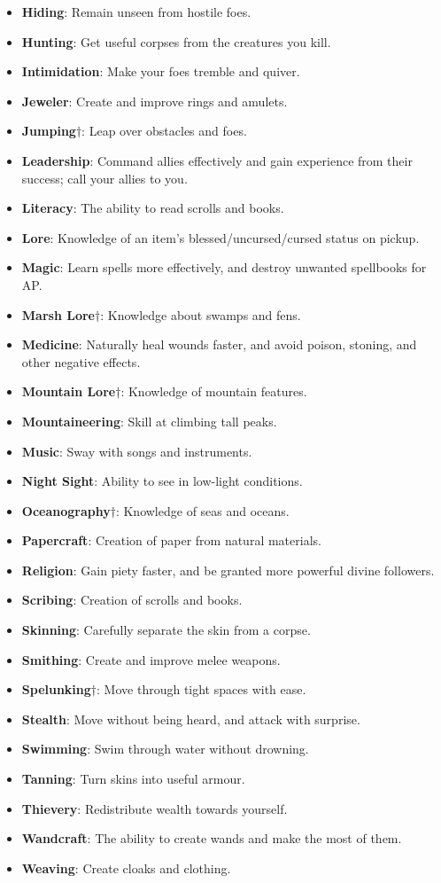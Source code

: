 \begin{itemize}
\item {\bf Hiding}: Remain unseen from hostile foes.
\item {\bf Hunting}: Get useful corpses from the creatures you kill. 
\item {\bf Intimidation}: Make your foes tremble and quiver. 
\item {\bf Jeweler}: Create and improve rings and amulets. 
\item {\bf Jumping}$\dagger$: Leap over obstacles and foes.
\item {\bf Leadership}: Command allies effectively and gain experience from their success; call your allies to you. 
\item {\bf Literacy}: The ability to read scrolls and books.
\item {\bf Lore}: Knowledge of an item's blessed/uncursed/cursed status on pickup.
\item {\bf Magic}: Learn spells more effectively, and destroy unwanted spellbooks for AP.
\item {\bf Marsh Lore}$\dagger$: Knowledge about swamps and fens. 
\item {\bf Medicine}: Naturally heal wounds faster, and avoid poison, stoning, and other negative effects.
\item {\bf Mountain Lore}$\dagger$: Knowledge of mountain features. 
\item {\bf Mountaineering}: Skill at climbing tall peaks. 
\item {\bf Music}: Sway with songs and instruments. 
\item {\bf Night Sight}: Ability to see in low-light conditions. 
\item {\bf Oceanography}$\dagger$: Knowledge of seas and oceans. 
\item {\bf Papercraft}: Creation of paper from natural materials. 
\item {\bf Religion}: Gain piety faster, and be granted more powerful divine followers. 
\item {\bf Scribing}: Creation of scrolls and books. 
\item {\bf Skinning}: Carefully separate the skin from a corpse. 
\item {\bf Smithing}: Create and improve melee weapons.
\item {\bf Spelunking}$\dagger$: Move through tight spaces with ease.
\item {\bf Stealth}: Move without being heard, and attack with surprise.
\item {\bf Swimming}: Swim through water without drowning.
\item {\bf Tanning}: Turn skins into useful armour.
\item {\bf Thievery}: Redistribute wealth towards yourself.
\item {\bf Wandcraft}: The ability to create wands and make the most of them.
\item {\bf Weaving}: Create cloaks and clothing.
\end{itemize}

